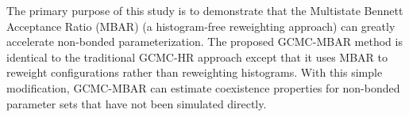 \documentclass[journal=jced,manuscript=article]{achemso}
\begin{document}




The primary purpose of this study is to demonstrate that the Multistate Bennett Acceptance Ratio (MBAR) (a histogram-free reweighting approach) can greatly accelerate non-bonded parameterization. The proposed GCMC-MBAR method is identical to the traditional GCMC-HR approach except that it uses MBAR to reweight configurations rather than reweighting histograms. With this simple modification, GCMC-MBAR can estimate coexistence properties for non-bonded parameter sets that have not been simulated directly. 
\end{document}
